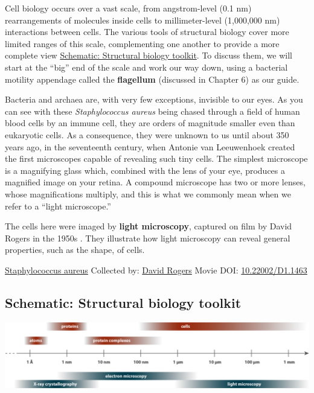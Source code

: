 \documentclass[]{tufte-book}
\begin{document}
Cell biology occurs over a vast scale, from angstrom-level (0.1 nm) rearrangements of molecules inside cells to millimeter-level (1,000,000 nm) interactions between cells. The various tools of structural biology cover more limited ranges of this scale, complementing one another to provide a more complete view \protect\hyperlink{Structural_biology_toolkit}{Schematic: Structural biology toolkit}. To discuss them, we will start at the ``big'' end of the scale and work our way down, using a bacterial motility appendage called the \textbf{flagellum} (discussed in Chapter 6) as our guide.

Bacteria and archaea are, with very few exceptions, invisible to our eyes. As you can see with these \emph{Staphylococcus aureus} being chased through a field of human blood cells by an immune cell, they are orders of magnitude smaller even than eukaryotic cells. As a consequence, they were unknown to us until about 350 years ago, in the seventeenth century, when Antonie van Leeuwenhoek created the first microscopes capable of revealing such tiny cells. The simplest microscope is a magnifying glass which, combined with the lens of your eye, produces a magnified image on your retina. A compound microscope has two or more lenses, whose magnifications multiply, and this is what we commonly mean when we refer to a ``light microscope.''

The cells here were imaged by \textbf{light microscopy}, captured on film by David Rogers in the 1950s \citep{hillInternet}. They illustrate how light microscopy can reveal general properties, such as the shape, of cells.



\hypertarget{htmlwidget-dc25983841ec40881b34}{}

\label{fig:1-1}\protect\hyperlink{tree}{Staphylococcus aureus} Collected by: \protect\hyperlink{david_rogers}{David Rogers} Movie DOI: \href{https://doi.org/10.22002/D1.1463}{10.22002/D1.1463}

\hypertarget{Structural_biology_toolkit}{%
\subsection*{Schematic: Structural biology toolkit}\label{Structural_biology_toolkit}}

\includegraphics[width=38.54in]{img/schematics/1_1_1}
\end{document}
